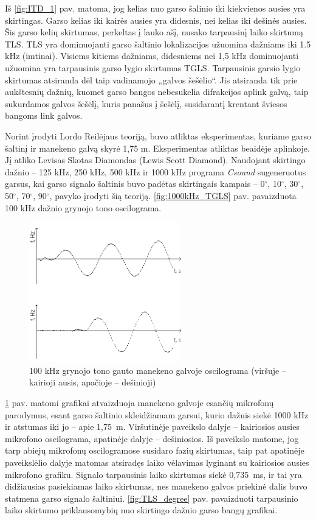 \documentclass[]{vgtuef}
\begin{document}
Iš \ref{fig:ITD_1} pav. matoma, jog kelias nuo garso šalinio iki kiekvienos ausies yra skirtingas. Garso kelias iki kairės ausies yra didesnis, nei kelias iki dešinės ausies. Šis garso kelių skirtumas, perkeltas į lauko ašį, nusako tarpausinį laiko skirtumą TLS.
TLS yra dominuojanti garso šaltinio lokalizacijos užuomina dažniams iki 1.5 kHz (imtinai). Visiems kitiems dažniams, didesniems nei 1,5 kHz dominuojanti užuomina yra tarpausinis garso lygio skirtumas TGLS. Tarpausinis garsio lygio skirtumas atsiranda dėl taip vadinamojo „galvos šešėlio“. Jis atsiranda tik prie aukštesnių dažnių, kuomet garso bangos nebesukelia difrakcijos aplink galvą, taip sukurdamos galvos šešėlį, kuris panašus į šešėlį, susidarantį krentant šviesos bangoms link galvos.

Norint įrodyti Lordo Reilėjaus teoriją, buvo atliktas eksperimentas, kuriame garso šaltinį ir manekeno galvą skyrė 1,75 m. Eksperimentas atliktas beaidėje aplinkoje. Jį atliko Levisas Skotas Diamondas (Lewis Scott Diamond).  Naudojant skirtingo dažnio – 125 kHz, 250 kHz, 500 kHz ir 1000 kHz programa \textit{Csound} sugeneruotus garsus, kai garso signalo šaltinis buvo padėtas skirtingais kampais – 0$^\circ$, 10$^\circ$, 30$^\circ$, 50$^\circ$, 70$^\circ$, 90$^\circ$, pavyko įrodyti šią teoriją. \ref{fig:1000kHz_TGLS} pav. pavaizduota 100 kHz dažnio grynojo tono oscilograma.

\begin{figure}[!ht]
  \centering
  \includegraphics[width=250px]{img/100kHz_grynas.png}
  \caption{100 kHz grynojo tono gauto manekeno galvoje oscilograma \newline (viršuje – kairioji ausis, apačioje – dešinioji)}
  \label{fig:100kHz_grynas}
\end{figure}

\ref{fig:100kHz_grynas} pav. matomi grafikai atvaizduoja manekeno galvoje esančių mikrofonų parodymus, esant garso šaltinio skleidžiamam garsui, kurio dažnis siekė 1000 kHz ir atstumas iki jo – apie 1,75~m. Viršutinėje paveikslo dalyje – kairiosios ausies mikrofono oscilograma, apatinėje dalyje – dešiniosios. Iš paveikslo matome, jog tarp abiejų mikrofonų oscilogramose susidaro fazių skirtumas, taip pat apatinėje paveikslėlio dalyje matomas atsiradęs laiko vėlavimas lyginant su kairiosios ausies mikrofono grafiku. Signalo tarpausinis laiko skirtumas siekė 0,735~ms, ir tai yra didžiausias pasiekiamas laiko skirtumas, nes manekeno galvos priekinė dalis buvo statmena garso signalo šaltiniui. \ref{fig:TLS_degree} pav. pavaizduoti tarpausinio laiko skirtumo priklausomybių nuo skirtingo dažnio garso bangų grafikai.
\end{document}
